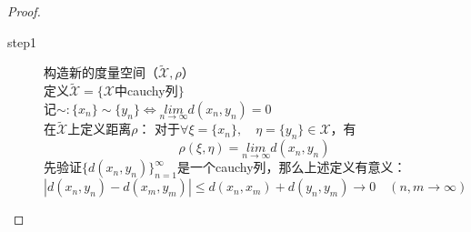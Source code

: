 \documentclass[12pt, a4paper, oneside]{ctexbook}
\begin{document}
	\begin{proof}
		\begin{description}
			\item[step1] $\textbf{构造新的度量空间}$（$\widetilde{\mathscr{X}},\rho$）\\
			定义$\widetilde{\mathscr{X}}=\{
			\mathscr{X}$中cauchy列$
			\}
			$\\记$\sim : \{
			x_n
			\}
			\sim
			\{
			y_n
			\}\Leftrightarrow \underset{n\to \infty}{lim}d(x_n,y_n)=0$
			\\
			在$\widetilde{\mathscr{X}}$上定义距离$\rho$：
			对于$\forall \xi =\{
			x_n
			\},\quad \eta =\{
			y_n
			\}\in \mathscr{X}$，有\begin{equation*}
				\rho(\xi,\eta)=\underset{n\to \infty}{lim}d(x_n,y_n)
			\end{equation*}
			先验证$\{
			d(x_n,y_n)
			\}^{\infty}_{n=1}$是一个cauchy列，那么上述定义有意义：\begin{equation*}
				\left | d(x_n,y_n)-d(x_m,y_m)\right |\leqslant
				d(x_n,x_m)+d(y_n,y_m)\rightarrow 0\quad (n,m\to \infty)
			\end{equation*}
			

\end{description}
\end{proof}
\end{document}
